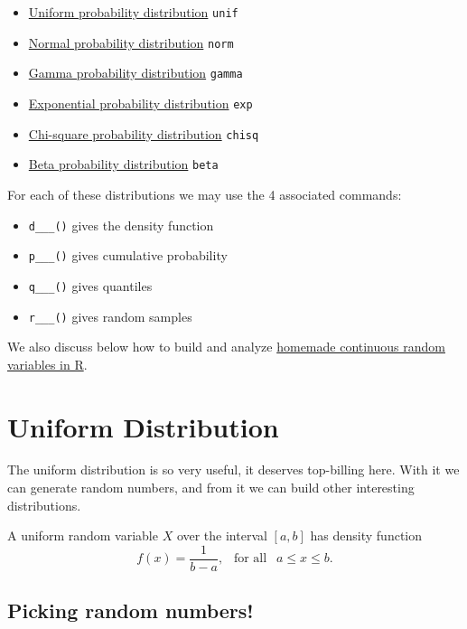 \documentclass[
]{book}
\providecommand{\tightlist}{%
  \setlength{\itemsep}{0pt}\setlength{\parskip}{0pt}}
\theoremstyle{definition}
\theoremstyle{definition}
\theoremstyle{definition}
\theoremstyle{definition}
\theoremstyle{remark}
\begin{document}
\begin{itemize}
\tightlist
\item
  \hyperref[unifR]{Uniform probability distribution} \textbar{} \texttt{unif}
\item
  \hyperref[normalR]{Normal probability distribution} \textbar{} \texttt{norm}
\item
  \hyperref[gammaR]{Gamma probability distribution} \textbar{} \texttt{gamma}
\item
  \hyperref[expR]{Exponential probability distribution} \textbar{} \texttt{exp}
\item
  \hyperref[chiR]{Chi-square probability distribution} \textbar{} \texttt{chisq}
\item
  \hyperref[betaR]{Beta probability distribution} \textbar{} \texttt{beta}
\end{itemize}

For each of these distributions we may use the 4 associated commands:

\begin{itemize}
\tightlist
\item
  \texttt{d\_\_\_()} gives the density function
\item
  \texttt{p\_\_\_()} gives cumulative probability
\item
  \texttt{q\_\_\_()} gives quantiles
\item
  \texttt{r\_\_\_()} gives random samples
\end{itemize}

We also discuss below how to build and analyze \hyperref[customR]{homemade continuous random variables in R}.

\section{Uniform Distribution}\label{unifR}

The uniform distribution is so very useful, it deserves top-billing here. With it we can generate random numbers, and from it we can build other interesting distributions.

A uniform random variable \(X\) over the interval \([a,b]\) has density function \[f(x) = \frac{1}{b-a}, ~~\text{ for all }~~ a \leq x \leq b.\]

\subsection*{Picking random numbers!}\label{picking-random-numbers}
\end{document}

